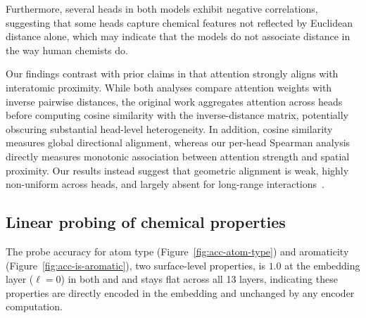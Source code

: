 Furthermore, several heads in both models exhibit negative correlations, suggesting that some heads capture chemical features not reflected by Euclidean distance alone, which may indicate that the models do not associate distance in the way human chemists do.

 Our findings contrast with prior claims in \molm that attention strongly aligns with interatomic proximity. While both analyses compare attention weights with inverse pairwise distances, the original work aggregates attention across heads before computing cosine similarity with the inverse-distance matrix, potentially obscuring substantial head-level heterogeneity. In addition, cosine similarity measures global directional alignment, whereas our per-head Spearman analysis directly measures monotonic association between attention strength and spatial proximity. Our results instead suggest that geometric alignment is weak, highly non-uniform across heads, and largely absent for long-range interactions~\cite{ross2022largescalechemicallanguagerepresentations}.

\subsection{Linear probing of chemical properties}
\label{sec:res-probe}


The probe accuracy for atom type (Figure~\ref{fig:acc-atom-type}) and aromaticity (Figure~\ref{fig:acc-is-aromatic}), two surface-level properties, is $1.0$ at the embedding layer ($\ell{=}0$) in both \molm and \smi and stays flat across all 13 layers, indicating these properties are directly encoded in the embedding and unchanged by any encoder computation.


